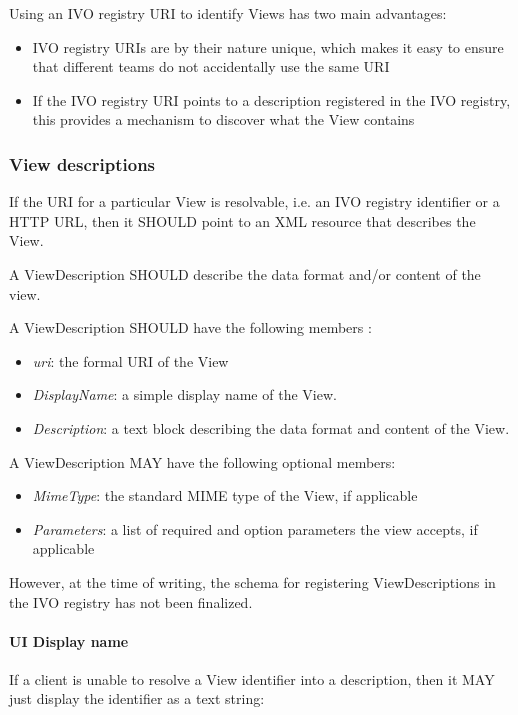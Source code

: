 \documentclass[11pt,a4paper]{ivoa}
\begin{document}
Using an IVO registry URI to identify Views has two main advantages:

\begin{itemize}
    \item IVO registry URIs are by their nature unique, which makes it easy to ensure that different teams do not accidentally use the same URI
    \item If the IVO registry URI points to a description registered in the IVO registry, this provides a mechanism to discover what the View contains
\end{itemize}

\subsubsection{View descriptions}
If the URI for a particular View is resolvable, i.e. an IVO registry identifier or a HTTP URL, then it SHOULD point to an XML resource that describes the View.

A ViewDescription SHOULD describe the data format and/or content of the view.

A ViewDescription SHOULD have the following members :

\begin{itemize}
    \item \emph{uri}: the formal URI of the View
    \item \emph{DisplayName}: a simple display name of the View.
    \item \emph{Description}: a text block describing the data format and content of the View.
\end{itemize}

A ViewDescription MAY have the following optional members:

\begin{itemize}
    \item \emph{MimeType}: the standard MIME type of the View, if applicable
    \item \emph{Parameters}: a list of required and option parameters the view accepts, if applicable
\end{itemize}

However, at the time of writing, the schema for registering ViewDescriptions in the IVO registry has not been finalized.

\paragraph{UI Display name}
If a client is unable to resolve a View identifier into a description, then it MAY just display the identifier as a text string:
\end{document}
